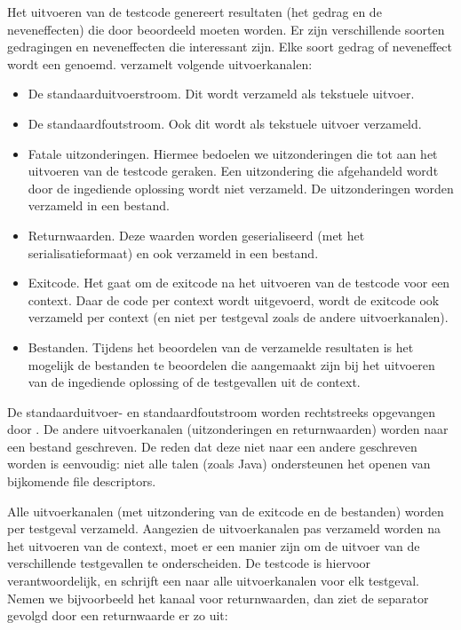 Het uitvoeren van de testcode genereert resultaten (het gedrag en de neveneffecten) die door \tested{} beoordeeld moeten worden.
Er zijn verschillende soorten gedragingen en neveneffecten die interessant zijn.
Elke soort gedrag of neveneffect wordt een  genoemd.
\tested{} verzamelt volgende uitvoerkanalen:
\begin{itemize}
    \item De standaarduitvoerstroom.
    Dit wordt verzameld als tekstuele uitvoer.
    \item De standaardfoutstroom.
    Ook dit wordt als tekstuele uitvoer verzameld.
    \item Fatale uitzonderingen.
    Hiermee bedoelen we uitzonderingen die tot aan het uitvoeren van de testcode geraken.
    Een uitzondering die afgehandeld wordt door de ingediende oplossing wordt niet verzameld.
    De uitzonderingen worden verzameld in een bestand.
    \item Returnwaarden.
    Deze waarden worden geserialiseerd (met het serialisatieformaat) en ook verzameld in een bestand.
    \item Exitcode.
    Het gaat om de exitcode na het uitvoeren van de testcode voor een context.
    Daar de code per context wordt uitgevoerd, wordt de exitcode ook verzameld per context (en niet per testgeval zoals de andere uitvoerkanalen).
    \item Bestanden.
    Tijdens het beoordelen van de verzamelde resultaten is het mogelijk de bestanden te beoordelen die aangemaakt zijn bij het uitvoeren van de ingediende oplossing of de testgevallen uit de context.
\end{itemize}

De standaarduitvoer- en standaardfoutstroom worden rechtstreeks opgevangen door \tested{}.
De andere uitvoerkanalen (uitzonderingen en returnwaarden) worden naar een bestand geschreven.
De reden dat deze niet naar een andere  geschreven worden is eenvoudig: niet alle talen (zoals Java) ondersteunen het openen van bijkomende file descriptors.

Alle uitvoerkanalen (met uitzondering van de exitcode en de bestanden) worden per testgeval verzameld.
Aangezien de uitvoerkanalen pas verzameld worden na het uitvoeren van de context, moet er een manier zijn om de uitvoer van de verschillende testgevallen te onderscheiden.
De testcode is hiervoor verantwoordelijk, en schrijft een  naar alle uitvoerkanalen voor elk testgeval.
Nemen we bijvoorbeeld het kanaal voor returnwaarden, dan ziet de separator gevolgd door een returnwaarde er zo uit: 


